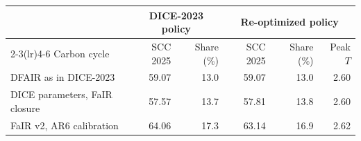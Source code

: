 \begin{tabular}{lrrrrr}
\toprule
 & \multicolumn{2}{c}{DICE-2023 policy} & \multicolumn{3}{c}{Re-optimized policy} \\
\cmidrule(lr){2-3}\cmidrule(lr){4-6}
Carbon cycle & SCC 2025 & Share (\%) & SCC 2025 & Share (\%) & Peak $T$ \\
\midrule
DFAIR as in DICE-2023 & 59.07 & 13.0 & 59.07 & 13.0 & 2.60 \\
DICE parameters, FaIR closure & 57.57 & 13.7 & 57.81 & 13.8 & 2.60 \\
FaIR v2, AR6 calibration & 64.06 & 17.3 & 63.14 & 16.9 & 2.62 \\
\bottomrule
\end{tabular}
